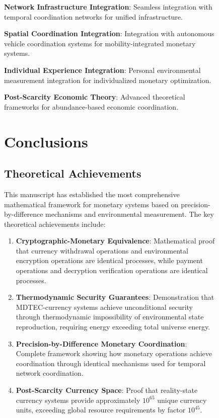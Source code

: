 \documentclass[12pt,a4paper]{article}
\begin{document}
\begin{figure}[H]
\textbf{Network Infrastructure Integration}: Seamless integration with temporal coordination networks for unified infrastructure.

\textbf{Spatial Coordination Integration}: Integration with autonomous vehicle coordination systems for mobility-integrated monetary systems.

\textbf{Individual Experience Integration}: Personal environmental measurement integration for individualized monetary optimization.

\textbf{Post-Scarcity Economic Theory}: Advanced theoretical frameworks for abundance-based economic coordination.

\section{Conclusions}

\subsection{Theoretical Achievements}

This manuscript has established the most comprehensive mathematical framework for monetary systems based on precision-by-difference mechanisms and environmental measurement. The key theoretical achievements include:

\begin{enumerate}
\item \textbf{Cryptographic-Monetary Equivalence}: Mathematical proof that currency withdrawal operations and environmental encryption operations are identical processes, while payment operations and decryption verification operations are identical processes.

\item \textbf{Thermodynamic Security Guarantees}: Demonstration that MDTEC-currency systems achieve unconditional security through thermodynamic impossibility of environmental state reproduction, requiring energy exceeding total universe energy.

\item \textbf{Precision-by-Difference Monetary Coordination}: Complete framework showing how monetary operations achieve coordination through identical mechanisms used for temporal network coordination.

\item \textbf{Post-Scarcity Currency Space}: Proof that reality-state currency systems provide approximately $10^{65}$ unique currency units, exceeding global resource requirements by factor $10^{45}$.


\end{enumerate}
\end{figure}
\end{document}

